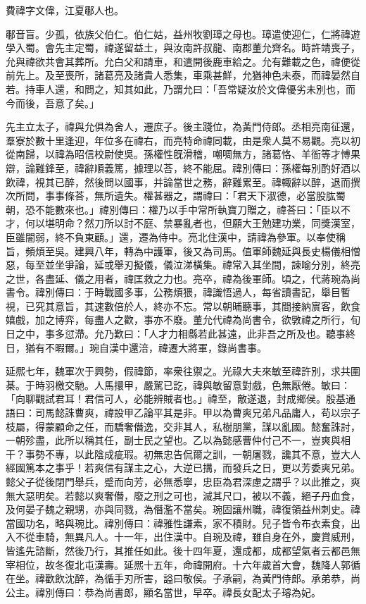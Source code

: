 
\begin{pinyinscope}
費禕字文偉，江夏鄳人也。

鄳音盲。少孤，依族父伯仁。伯仁姑，益州牧劉璋之母也。璋遣使迎仁，仁將禕遊學入蜀。會先主定蜀，禕遂留益土，與汝南許叔龍、南郡董允齊名。時許靖喪子，允與禕欲共會其葬所。允白父和請車，和遣開後鹿車給之。允有難載之色，禕便從前先上。及至喪所，諸葛亮及諸貴人悉集，車乘甚鮮，允猶神色未泰，而禕晏然自若。持車人還，和問之，知其如此，乃謂允曰：「吾常疑汝於文偉優劣未別也，而今而後，吾意了矣。」

先主立太子，禕與允俱為舍人，遷庶子。後主踐位，為黃門侍郎。丞相亮南征還，羣寮於數十里逢迎，年位多在禕右，而亮特命禕同載，由是衆人莫不易觀。亮以初從南歸，以禕為昭信校尉使吳。孫權性旣滑稽，嘲啁無方，諸葛恪、羊衜等才愽果辯，論難鋒至，禕辭順義篤，據理以荅，終不能屈。禕別傳曰：孫權每別酌好酒以飲禕，視其已醉，然後問以國事，并論當世之務，辭難累至。禕輙辭以醉，退而撰次所問，事事條荅，無所遺失。權甚器之，謂禕曰：「君天下淑德，必當股肱蜀朝，恐不能數來也。」禕別傳曰：權乃以手中常所執寶刀贈之，禕荅曰：「臣以不才，何以堪明命？然刀所以討不庭、禁暴亂者也，但願大王勉建功業，同獎漢室，臣雖闇弱，終不負東顧。」還，遷為侍中。亮北住漢中，請禕為參軍。以奉使稱旨，頻煩至吳。建興八年，轉為中護軍，後又為司馬。值軍師魏延與長史楊儀相憎惡，每至並坐爭論，延或舉刃擬儀，儀泣涕橫集。禕常入其坐間，諫喻分別，終亮之世，各盡延、儀之用者，禕匡救之力也。亮卒，禕為後軍師。頃之，代蔣琬為尚書令。禕別傳曰：于時戰國多事，公務煩猥，禕識悟過人，每省讀書記，舉目暫視，已究其意旨，其速數倍於人，終亦不忘。常以朝晡聽事，其間接納賔客，飲食嬉戲，加之博弈，每盡人之歡，事亦不廢。董允代禕為尚書令，欲斆禕之所行，旬日之中，事多愆滯。允乃歎曰：「人才力相縣若此甚遠，此非吾之所及也。聽事終日，猶有不暇爾。」琬自漢中還涪，禕遷大將軍，錄尚書事。

延熈七年，魏軍次于興勢，假禕節，率衆往禦之。光祿大夫來敏至禕許別，求共圍棊。于時羽檄交馳。人馬擐甲，嚴駕已訖，禕與敏留意對戲，色無厭倦。敏曰：「向聊觀試君耳！君信可人，必能辨賊者也。」禕至，敵遂退，封成鄉侯。殷基通語曰：司馬懿誅曹爽，禕設甲乙論平其是非。甲以為曹爽兄弟凡品庸人，苟以宗子枝屬，得蒙顧命之任，而驕奢僭逸，交非其人，私樹朋黨，謀以亂國。懿奮誅討，一朝殄盡，此所以稱其任，副士民之望也。乙以為懿感曹仲付己不一，豈爽與相干？事勢不專，以此陰成疵瑕。初無忠告侃爾之訓，一朝屠戮，讒其不意，豈大人經國篤本之事乎！若爽信有謀主之心，大逆已搆，而發兵之日，更以芳委爽兄弟。懿父子從後閉門舉兵，蹙而向芳，必無悉寧，忠臣為君深慮之謂乎？以此推之，爽無大惡明矣。若懿以爽奢僭，廢之刑之可也，滅其尺口，被以不義，絕子丹血食，及何晏子魏之親甥，亦與同戮，為僭濫不當矣。琬固讓州職，禕復領益州刺史。禕當國功名，略與琬比。禕別傳曰：禕雅性謙素，家不積財。兒子皆令布衣素食，出入不從車騎，無異凡人。十一年，出住漢中。自琬及禕，雖自身在外，慶賞威刑，皆遙先諮斷，然後乃行，其推任如此。後十四年夏，還成都，成都望氣者云都邑無宰相位，故冬復北屯漢壽。延熈十五年，命禕開府。十六年歲首大會，魏降人郭循在坐。禕歡飲沈醉，為循手刃所害，謚曰敬侯。子承嗣，為黃門侍郎。承弟恭，尚公主。禕別傳曰：恭為尚書郎，顯名當世，早卒。禕長女配太子璿為妃。


\end{pinyinscope}